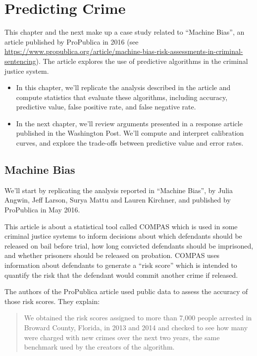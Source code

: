 \chapter{Predicting Crime}\label{predicting-crime}

This chapter and the next make up a case study related to ``Machine
Bias'', an article published by ProPublica in 2016 (see
\url{https://www.propublica.org/article/machine-bias-risk-assessments-in-criminal-sentencing}).
The article explores the use of predictive algorithms in the criminal
justice system.

\begin{itemize}
\item
  In this chapter, we'll replicate the analysis described in the article
  and compute statistics that evaluate these algorithms, including
  accuracy, predictive value, false positive rate, and false negative
  rate.
\item
  In the next chapter, we'll review arguments presented in a response
  article published in the Washington Post. We'll compute and interpret
  calibration curves, and explore the trade-offs between predictive
  value and error rates.
\end{itemize}

\section{Machine Bias}\label{machine-bias}

We'll start by replicating the analysis reported in ``Machine Bias'', by
Julia Angwin, Jeff Larson, Surya Mattu and Lauren Kirchner, and
published by ProPublica in May 2016.

This article is about a statistical tool called COMPAS which is used in
some criminal justice systems to inform decisions about which defendants
should be released on bail before trial, how long convicted defendants
should be imprisoned, and whether prisoners should be released on
probation. COMPAS uses information about defendants to generate a ``risk
score'' which is intended to quantify the risk that the defendant would
commit another crime if released.

The authors of the ProPublica article used public data to assess the
accuracy of those risk scores. They explain:

\begin{quote}
We obtained the risk scores assigned to more than 7,000 people arrested
in Broward County, Florida, in 2013 and 2014 and checked to see how many
were charged with new crimes over the next two years, the same benchmark
used by the creators of the algorithm.
\end{quote}

